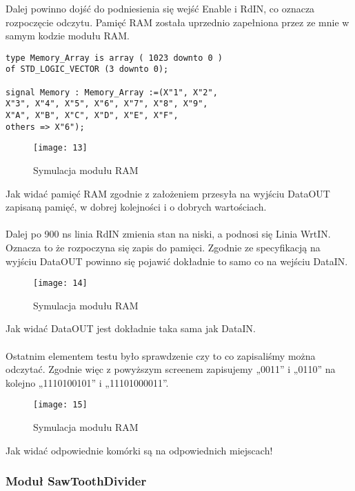 \documentclass[11pt]{article}
\begin{document}
	Dalej powinno dojść do podniesienia się wejść Enable i RdIN, co oznacza rozpoczęcie odczytu. Pamięć RAM została uprzednio zapełniona przez ze mnie w samym kodzie modułu RAM.
	
	\begin{lstlisting}[frame=single, caption={Implementacja RAM},captionpos=b]
type Memory_Array is array ( 1023 downto 0 )
of STD_LOGIC_VECTOR (3 downto 0);
	
signal Memory : Memory_Array :=(X"1", X"2",
X"3", X"4", X"5", X"6", X"7", X"8", X"9",
X"A", X"B", X"C", X"D", X"E", X"F",
others => X"6");
	\end{lstlisting}
	
	\begin{figure}[H]
		\centering
		\centerline{\texttt{[image: 13]}}
		\caption{Symulacja modułu RAM}
		\label{fig:11}
	\end{figure}
	
	Jak widać pamięć RAM zgodnie z założeniem przesyła na wyjściu DataOUT zapisaną pamięć, w dobrej kolejności i o dobrych wartościach.\\\\Dalej po 900 ns linia RdIN zmienia stan na niski, a podnosi się Linia WrtIN. Oznacza to że rozpoczyna się zapis do pamięci. Zgodnie ze specyfikacją na wyjściu DataOUT powinno się pojawić dokładnie to samo co na wejściu DataIN.
	
	\begin{figure}[H]
		\centering
		\centerline{\texttt{[image: 14]}}
		\caption{Symulacja modułu RAM}
		\label{fig:11}
	\end{figure}
	
	Jak widać DataOUT jest dokładnie taka sama jak DataIN.\\\\Ostatnim elementem testu było sprawdzenie czy to co zapisaliśmy można odczytać. Zgodnie więc z powyższym screenem zapisujemy „0011” i „0110” na kolejno „1110100101” i „11101000011”. 
	
	\begin{figure}[H]
		\centering
		\centerline{\texttt{[image: 15]}}
		\caption{Symulacja modułu RAM}
		\label{fig:11}
	\end{figure}
	
	Jak widać odpowiednie komórki są na odpowiednich miejscach!
	
	\subsubsection{Moduł SawToothDivider}
	
\end{document}
